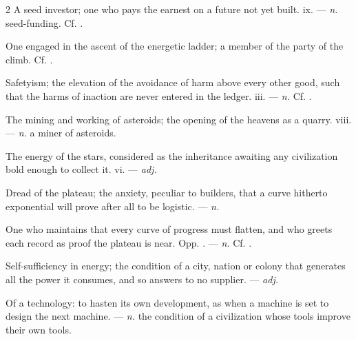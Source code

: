 \begin{multicols}{2}
 A seed investor; one who pays the earnest on a future not yet built.   ix. —  \textit{n.} seed-funding. Cf. .

 One engaged in the ascent of the energetic ladder; a member of the party of the climb.  Cf. .

 Safetyism; the elevation of the avoidance of harm above every other good, such that the harms of inaction are never entered in the ledger.   iii. —  \textit{n.} Cf. .

 The mining and working of asteroids; the opening of the heavens as a quarry.   viii. —  \textit{n.} a miner of asteroids.

 The energy of the stars, considered as the inheritance awaiting any civilization bold enough to collect it.   vi. —  \textit{adj.}

 Dread of the plateau; the anxiety, peculiar to builders, that a curve hitherto exponential will prove after all to be logistic. —  \textit{n.}

 One who maintains that every curve of progress must flatten, and who greets each record as proof the plateau is near. Opp. . —  \textit{n.} Cf. .

 Self-sufficiency in energy; the condition of a city, nation or colony that generates all the power it consumes, and so answers to no supplier. —  \textit{adj.}

 Of a technology: to hasten its own development, as when a machine is set to design the next machine.  —  \textit{n.} the condition of a civilization whose tools improve their own tools.


\end{multicols}
